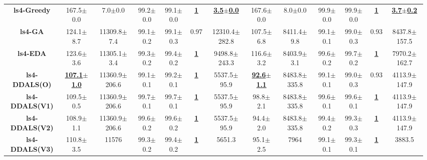 \documentclass[lettersize,journal]{IEEEtran}
\begin{document}
\begin{table}[!t]
{\begin{tabular}{ccccccccccccc}
        \midrule
        {\bfseries ls4-Greedy} &167.5$\pm$0.0 &7.0$\pm$0.0 & 99.2$\pm$0.0 &99.1$\pm$0.0 &\underline{\bfseries 1} &\underline{\bfseries 3.5$\pm$0.0} &167.6$\pm$0.0 &8.0$\pm$0.0& 99.9$\pm$0.0&99.9$\pm$0.0  &\underline{\bfseries 1} &\underline{\bfseries 3.7$\pm$0.2} \\
        {\bfseries ls4-GA} &124.1$\pm$8.7 &11309.8$\pm$7.4 & 99.1$\pm$0.2 &99.1$\pm$0.3 &0.97 &12310.4$\pm$282.8 &107.5$\pm$6.8 &8411.4$\pm$9.8 &99.1$\pm$0.1 &99.0$\pm$0.3  &0.93 &8437.8$\pm$157.5 \\
        {\bfseries ls4-EDA} &123.6$\pm$3.6 &11305.1$\pm$3.4 & 99.3$\pm$0.2 &99.4$\pm$0.2 &\underline{\bfseries 1} &9498.8$\pm$243.3 &116.6$\pm$3.2 & 8403.9$\pm$3.1 &99.6$\pm$0.2 &99.7$\pm$0.2  &\underline{\bfseries 1} &7970.2$\pm$162.7 \\
        {\bfseries ls4-DDALS(O)} &\underline{\bfseries 107.1$\pm$1.0} &11360.9$\pm$206.6 & 99.1$\pm$0.1 &99.2$\pm$0.1 &\underline{\bfseries 1} &5537.5$\pm$95.9 &\underline{\bfseries 92.6$\pm$1.1} &8483.8$\pm$335.8 &99.1$\pm$0.1 &99.0$\pm$0.3 &0.93 &4113.9$\pm$147.9 \\
        {\bfseries ls4-DDALS(V1)} &109.5$\pm$0.5 &11360.9$\pm$206.6 & 99.7$\pm$0.1 &99.7$\pm$0.1 &\underline{\bfseries 1} &5537.5$\pm$95.9 &98.8$\pm$2.1 &8483.8$\pm$335.8 &99.6$\pm$0.1 &99.6$\pm$0.1  &\underline{\bfseries 1} &4113.9$\pm$147.9 \\
        {\bfseries ls4-DDALS(V2)} &108.9$\pm$1.1 &11360.9$\pm$206.6 &99.6$\pm$0.2 &99.6$\pm$0.2 &\underline{\bfseries 1} &5537.5$\pm$95.9 &94.4$\pm$2.0 &8483.8$\pm$335.8 &99.4$\pm$0.2 &99.3$\pm$0.3  &\underline{\bfseries 1} &4113.9$\pm$147.9 \\
        {\bfseries ls4-DDALS(V3)} &110.8$\pm$3.5 &11576 &99.3$\pm$0.2 &99.4$\pm$0.2 &\underline{\bfseries 1} &5651.3 &95.1$\pm$2.5 &7964 & 99.1$\pm$0.1 &99.3$\pm$0.1 &\underline{\bfseries 1} &3883.5 \\
        
        \bottomrule
    \end{tabular}
    }
\label{result:LAB}
\end{table}
\end{document}
